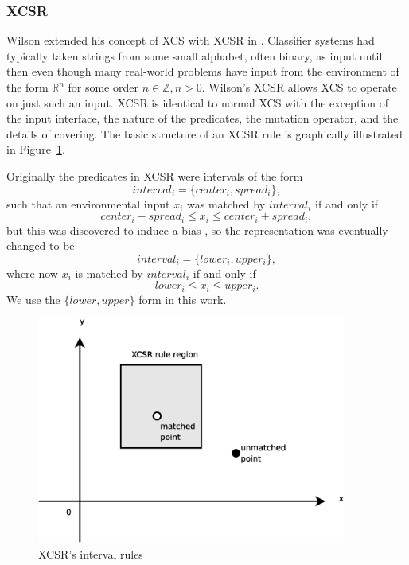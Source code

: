 \subsubsection{XCSR}
Wilson extended his concept of XCS with XCSR in \cite{WilsonXCSR}.
Classifier systems had typically taken strings from some small alphabet, often binary, as input until then
even though many real-world problems have input from the environment of the form $\mathbb{R}^n$ for some order $n \in \mathbb{Z}, n>0$.
Wilson's XCSR allows XCS to operate on just such an input.
XCSR is identical to normal XCS with the exception of the input interface, the nature of the predicates, the mutation operator, and the details of covering.
The basic structure of an XCSR rule is graphically illustrated in Figure~\ref{fig:xcsr-rule}.

Originally the predicates in XCSR were intervals of the form
\begin{equation}
interval_i = \{center_i,spread_i\},
\end{equation}
such that an environmental input $x_i$ was matched by $interval_i$ if and only if
\begin{equation}
center_i-spread_i \le x_i \le center_i+spread_i,
\end{equation}
but this was discovered to induce a bias \cite{StoneBull:2003}, so the representation was eventually changed to be
\begin{equation}
interval_i = \{lower_i,upper_i\},
\end{equation}
where now $x_i$ is matched by $interval_i$ if and only if
\begin{equation}
lower_i \le x_i \le upper_i.
\end{equation}
We use the $\{lower,upper\}$ form in this work.

\begin{figure}
\begin{center}
\includegraphics[width=4in]{xcsr-interval.eps}
\caption{XCSR's interval rules}
\label{fig:xcsr-rule}
\end{center}
\end{figure}

